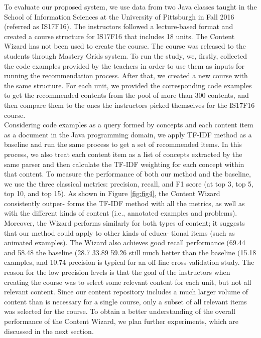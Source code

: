 \documentclass{sig-alternate}
\begin{document}
To evaluate our proposed system, we use data from two Java classes
taught in the School of Information Sciences at the University
of Pittsburgh in Fall 2016 (referred as IS17F16). The instructors
followed a lecture-based format and created a course structure
for IS17F16 that includes 18 units. The Content Wizard has not
been used to create the course. The course was released to the
students through Mastery Grids system. To run the study, we, firstly,
collected the code examples provided by the teachers in order to use
them as inputs for running the recommendation process. After that,
we created a new course with the same structure. For each unit, we
provided the corresponding code examples to get the recommended
contents from the pool of more than 300 contents, and then compare
them to the ones the instructors picked themselves for the IS17F16
course.\\
\quad Considering code examples as a query formed by concepts and
each content item as a document in the Java programming domain,
we apply TF-IDF method as a baseline and run the same process to
get a set of recommended items. In this process, we also treat each
content item as a list of concepts extracted by the same parser and
then calculate the TF-IDF weighting for each concept within that
content. To measure the performance of both our method and the baseline, we use the three classical metrics: precision, recall, and
F1 score (at top 3, top 5, top 10, and top 15).
As shown in Figure \ref{fig:fig4}, the Content Wizard consistently outper-
forms the TF-IDF method with all the metrics, as well as with the
different kinds of content (i.e., annotated examples and problems).
Moreover, the Wizard performs similarly for both types of content;
it suggests that our method could apply to other kinds of educa-
tional items (such as animated examples). The Wizard also achieves
good recall performance (69.44%
and 58.48%
the baseline (28.7%
33.89%
59.26%
still much better than the baseline (15.18%
examples, and 10.74%
precision is typical for an off-line cross-validation study. The reason
for the low precision levels is that the goal of the instructors when
creating the course was to select some relevant content for each
unit, but not all relevant content. Since our content repository
includes a much larger volume of content than is necessary for a
single course, only a subset of all relevant items was selected for the
course. To obtain a better understanding of the overall performance
of the Content Wizard, we plan further experiments, which are
discussed in the next section.
\end{document}
